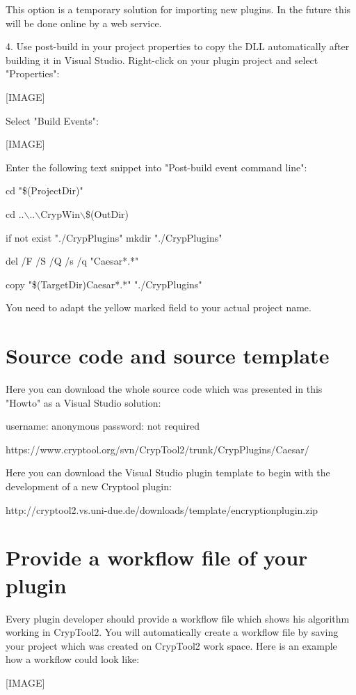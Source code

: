 This option is a temporary solution for importing new plugins. In the future this will be done online by a web service.

\hspace{20pt}4. Use post-build in your project properties to copy the DLL automatically after building it in Visual Studio. Right-click on your plugin project and select "Properties":

[IMAGE]

Select "Build Events":

[IMAGE]

Enter the following text snippet into "Post-build event command line":

cd "\$(ProjectDir)"

cd ..$\backslash$..$\backslash$CrypWin$\backslash$\$(OutDir)

if not exist "./CrypPlugins" mkdir "./CrypPlugins"

del /F /S /Q /s /q "Caesar*.*"

copy "\$(TargetDir)Caesar*.*" "./CrypPlugins"

You need to adapt the yellow marked field to your actual project name.

\section{Source code and source template}\label{sec:SourceCodeAndSourceTemplate}
Here you can download the whole source code which was presented in this "Howto" as a Visual Studio solution:

username: anonymous\newline
password: not required

https://www.cryptool.org/svn/CrypTool2/trunk/CrypPlugins/Caesar/


Here you can download the Visual Studio plugin template to begin with the development of a new Cryptool plugin:

http://cryptool2.vs.uni-due.de/downloads/template/encryptionplugin.zip

\section{Provide a workflow file of your plugin}\label{ProvideAWorkflowFileOfYourPlugin}
Every plugin developer should provide a workflow file which shows his algorithm working in CrypTool2. You will automatically create a workflow file by saving your project which was created on CrypTool2 work space. Here is an example how a workflow could look like:

[IMAGE]
